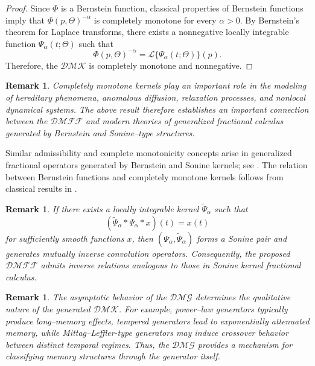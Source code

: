 \documentclass[11pt]{article}
\numberwithin{equation}{section}
\newtheorem{remark}[definition]{Remark}
\begin{document}
\begin{proof}

Since \(\Phi\) is a Bernstein function, classical properties
of Bernstein functions imply that
\(
\Phi(p,\Theta)^{-\alpha}
\)
is completely monotone for every \(\alpha>0\). By Bernstein's theorem
for Laplace transforms, there exists a nonnegative locally integrable
function
\(
\Psi_\alpha(t;\Theta)
\)
such that
\[
\Phi(p,\Theta)^{-\alpha}
=
\mathcal L
\{
\Psi_\alpha(t;\Theta)
\}(p).
\]
Therefore, the $\mathcal{DMK}$ is completely monotone and nonnegative.

\end{proof}


\begin{remark}
Completely monotone kernels play an important role in the modeling of
hereditary phenomena, anomalous diffusion, relaxation processes, and
nonlocal dynamical systems. The above result therefore establishes an
important connection between the $\mathcal{DMFF}$ and modern theories of generalized
fractional calculus generated by Bernstein and Sonine--type structures.
\end{remark}

\noindent Similar admissibility and complete monotonicity concepts arise in generalized fractional operators generated by Bernstein and Sonine kernels; see \cite{Luchko2021}. The relation between Bernstein functions and completely monotone kernels follows from classical results in \cite{Schilling2012}. 



\begin{remark}
If there exists a locally integrable kernel
\(
\widetilde{\Psi}_\alpha
\)
such that
\[
(\widetilde{\Psi}_\alpha * \Psi_\alpha * x)(t)
=
x(t)
\]
for sufficiently smooth functions \(x\), then
\(
(\Psi_\alpha,\widetilde{\Psi}_\alpha)
\)
forms a Sonine pair and generates mutually inverse convolution operators. Consequently, the proposed $\mathcal{DMFF}$  admits inverse relations analogous to those in Sonine kernel fractional calculus.
\end{remark}


\begin{remark}
The asymptotic behavior of the $\mathcal{DMG}$  determines the qualitative nature of the generated $\mathcal{DMK}$. For example, power--law generators typically produce long--memory effects, tempered generators lead to exponentially attenuated memory, while Mittag--Leffler-type generators may induce crossover behavior between distinct temporal regimes. Thus, the  $\mathcal{DMG}$  provides a mechanism for classifying memory structures through the generator itself.
\end{remark}
\end{document}
